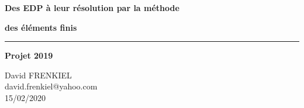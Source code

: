 \begin{center}

{\Large\textbf{Des EDP à leur résolution par la méthode}}

{\Large\textbf{des éléments finis}}

\rule[1mm]{12cm}{2pt}

{\large\textbf{Projet 2019}}

\smallskip

{\large{David FRENKIEL}} \\
\smallskip
{\large{david.frenkiel@yahoo.com}} \\
\smallskip
{\large{15/02/2020}}

\end{center}
\vspace{10pt}
